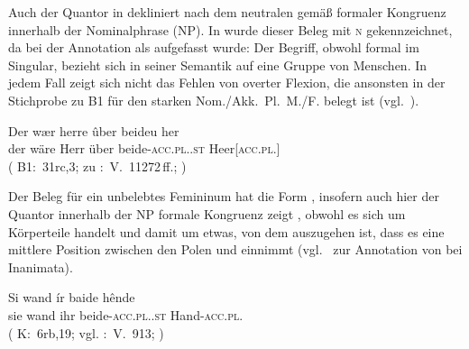\begin{exe}
\end{exe}

Auch der Quantor in  dekliniert nach dem neutralen
 gemäß formaler Kongruenz innerhalb der
Nominalphrase (NP). In  wurde dieser
Beleg mit \textsc{n\subA} gekennzeichnet, da   bei der
Annotation als  \autocite[211--213]{corbett2006} aufgefasst
wurde: Der Begriff, obwohl formal im Singular, bezieht sich in seiner Semantik
auf eine Gruppe von Menschen. In jedem Fall zeigt sich nicht das Fehlen von
overter Flexion, die ansonsten in der Stichprobe zu B1 für den starken
Nom./Akk.~Pl.~M./F. belegt ist (vgl.~).

\begin{exe}
\ex \label{ex:beideuher}
	\gll Der wær herre ûber beideu her \\
		der wäre Herr über beide-\textsc{acc.pl.\NeutA.st} Heer[\textsc{acc.pl.\NeutA}] \\
	\trans {}
		(%
			B1:~31rc,3; zu
			\KC:~V.~11272\,ff.;
			\cite[287]{schroeder1895}%
		)
\end{exe}

Der Beleg für ein unbelebtes Femininum hat die Form ,
insofern auch hier der Quantor innerhalb der NP formale
Kongruenz zeigt , obwohl es sich um
Körperteile handelt und damit um etwas, von dem auszugehen ist,
dass es eine mittlere Position zwischen den Polen  und
 einnimmt (vgl.~ zur
Annotation von  bei Inanimata).

\begin{exe}
	\ex \gll Si wand ír baide hênde \\
			sie wand ihr beide-\textsc{acc.pl.\FemI.st} Hand-\textsc{acc.pl.\FemI} \\
		\trans {}
			(%
				K:~6rb,19; vgl.
				\KC:~V.~913;
				\cite[98]{schroeder1895}%
			)
		\label{ex:uozehende_2}
\end{exe}

